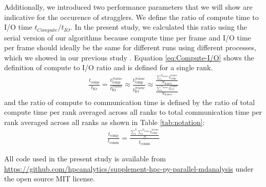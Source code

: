 Additionally, we introduced two performance parameters that we will show are indicative for the occurence of stragglers.
We define the ratio of compute time to I/O time $t_{Compute}/t_{IO}$. 
In the present study, we calculated this ratio using the serial version of our algorithms because compute time per frame and I/O time per frame should ideally be the same for different runs using different processes, which we showed in our previous study \cite{Khoshlessan:2017ab}.
Equation \ref{eq:Compute-I/O} shows the definition of compute to I/O ratio and is defined for a single rank.
 
\begin{gather}
  \label{eq:Compute-I/O}
    \frac{t_{\text{comp}}}{t_{\text{IO}}}=\frac{t_{\text{comp}}^{frame}}{t_{\text{IO}}^{frame}} \approx \frac{\overline{t_{\text{comp}}^{frame}}}{\overline{t_{\text{IO}}^{frame}}} \approx \frac{\frac{\sum_{1}^{N_{\text{frames}}}t_{\text{comp}}^{frame}}{N_{\text{frames}}}}{\frac{\sum_{1}^{N_{\text{frames}}}t_{\text{I/O}}^{frame}}{N_{\text{frames}}}} 
 \end{gather}
and the ratio of compute to communication time is defined by the ratio of total compute time per rank averaged across all ranks to total communication time per rank averaged across all ranks as shown in Table \ref{tab:notation}:
\begin{gather}
  \label{eq:Compute-comm}
       \frac{t_{\text{comp}}}{t_{\text{comm}}}= \frac{\frac{\sum_{1}^{N}\sum_{1}^{N_{\text{frames}}}t_{\text{comp}}^{frame}}{N}}{\overline{t_{\text{comm}}}}  
 \end{gather}
 
All code used in the present study is available from \url{https://github.com/hpcanalytics/supplement-hpc-py-parallel-mdanalysis} under the open source MIT license. 
 
